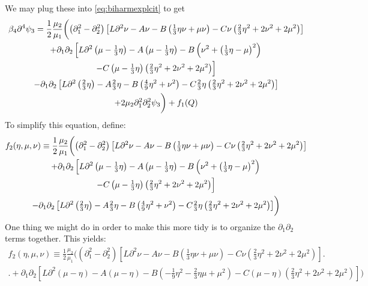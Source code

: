 \documentclass[reqno]{article}
\begin{document}
	We may plug these into \eqref{eq:biharmexplcit} to get
	\begin{multline}
		\beta_4 \partial^4 \psi_3 = \frac12 \frac{\mu_2}{\mu_1} \biggl( \left( \partial_1^2 - \partial_2^2\right)\left[ L\partial^2 \nu - A\nu - B\left(\tfrac{1}{3}\eta\nu + \mu\nu\right) - C\nu\left( \tfrac{2}{3}\eta^2 + 2\nu^2 + 2\mu^2 \right) \right]\biggr. \\
		+ \partial_1\partial_2 \left[ L\partial^2 \left( \mu - \tfrac{1}{3}\eta \right) - A\left( \mu - \tfrac{1}{3}\eta \right) - B\left( \nu^2 + 
		\left( \tfrac{1}{3}\eta - \mu \right)^2 \right)\right. \\
		\Bigl.- C\left( \mu - \tfrac{1}{3}\eta \right)\left( \tfrac{2}{3}\eta^2 + 2\nu^2 + 2\mu^2 \right) \Bigr] \\
		- \partial_1\partial_2 \left[L\partial^2 \left( \tfrac{2}{3}\eta \right) - A \tfrac{2}{3}\eta - B\left( \tfrac{4}{9}\eta^2 + \nu^2 \right) - C \tfrac{2}{3}\eta \left( \tfrac{2}{3}\eta^2 + 2\nu^2 + 2\mu^2 \right) \right] \\
		\biggl. + 2\mu_2 \partial_1^2\partial_2^2 \psi_3 \biggr) + f_1(Q) \\
	\end{multline}
	To simplify this equation, define:
	\begin{multline} \label{eq:f2-1}
		f_2(\eta, \mu, \nu) \equiv \frac12 \frac{\mu_2}{\mu_1} \biggl( \left( \partial_1^2 - \partial_2^2\right)\left[ L\partial^2 \nu - A\nu - B\left(\tfrac{1}{3}\eta\nu + \mu\nu\right) - C\nu\left( \tfrac{2}{3}\eta^2 + 2\nu^2 + 2\mu^2 \right) \right]\biggr. \\
		+ \partial_1\partial_2 \left[ L\partial^2 \left( \mu - \tfrac{1}{3}\eta \right) - A\left( \mu - \tfrac{1}{3}\eta \right) - B\left( \nu^2 + 
		\left( \tfrac{1}{3}\eta - \mu \right)^2 \right)\right. \\
		\Bigl.- C\left( \mu - \tfrac{1}{3}\eta \right)\left( \tfrac{2}{3}\eta^2 + 2\nu^2 + 2\mu^2 \right) \Bigr] \\
		\biggl.- \partial_1\partial_2 \left[L\partial^2 \left( \tfrac{2}{3}\eta \right) - A \tfrac{2}{3}\eta - B\left( \tfrac{4}{9}\eta^2 + \nu^2 \right) - C \tfrac{2}{3}\eta \left( \tfrac{2}{3}\eta^2 + 2\nu^2 + 2\mu^2 \right) \right] \biggr)
	\end{multline}
	One thing we might do in order to make this more tidy is to organize the $\partial_1\partial_2$ terms together. This yields:
	\begin{multline}\label{eq:f2}
		f_2(\eta, \mu, \nu) \equiv \frac12 \frac{\mu_2}{\mu_1} \biggl( \left( \partial_1^2 - \partial_2^2\right)\left[ L\partial^2 \nu - A\nu - B\left(\tfrac{1}{3}\eta\nu + \mu\nu\right) - C\nu\left( \tfrac{2}{3}\eta^2 + 2\nu^2 + 2\mu^2 \right) \right]\biggr. \\
		\biggl. + \partial_1\partial_2 \left[ L\partial^2 \left( \mu - \eta \right) - A\left( \mu - \eta \right) - B\left( -\tfrac19 \eta^2 - \tfrac23 \eta\mu + \mu^2 \right) - C\left( \mu - \eta\right) \left( \tfrac23 \eta^2 + 2\nu^2 + 2\mu^2 \right)\right] \biggr) 
	\end{multline}
\end{document}
